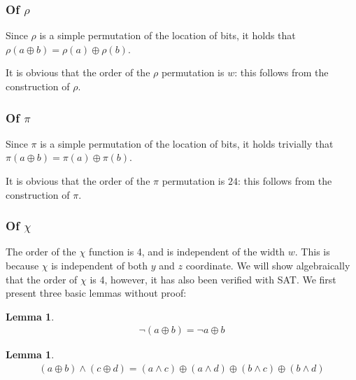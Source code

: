 \documentclass[10pt,twocolumn,twoside]{pnas-new}
\newtheorem{lemma}[theorem]{Lemma}
\begin{document}
\subsubsection{Of $\rho$} \label{sec:p:r}


Since $\rho$ is a simple permutation of the location of bits, it holds that
$\rho(a \oplus b) = \rho(a) \oplus \rho(b)$.

It is obvious that the order of the $\rho$ permutation is $w$: this follows
from the construction of $\rho$.

\subsubsection{Of $\pi$} \label{sec:p:p}


Since $\pi$ is a simple permutation of the location of bits, it holds trivially
that $\pi(a \oplus b) = \pi(a) \oplus \pi(b)$.

It is obvious that the order of the $\pi$ permutation is $24$: this follows
from the construction of $\pi$.

\subsubsection{Of $\chi$} \label{sec:p:c}


The order of the $\chi$ function is 4, and is independent of the width
$w$. This is because $\chi$ is independent of both $y$ and $z$ coordinate.
We will show algebraically that the order of $\chi$ is 4, however, it has also
been verified with SAT. We first present three basic lemmas without proof:

\begin{lemma} \label{lem:p:c:1}
\begin{align*}
    \lnot(a \oplus b) = \lnot a \oplus b
\end{align*}
\end{lemma}

\begin{lemma} \label{lem:p:c:2}
\begin{align*}
    (a \oplus b) \land (c \oplus d) = (a \land c) \oplus (a \land d) \oplus (b \land c) \oplus (b \land d)
\end{align*}
\end{lemma}
\end{document}
